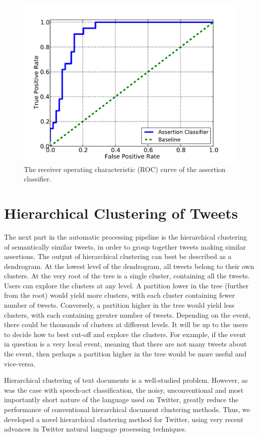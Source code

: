 \documentclass[letterpaper]{article}
\begin{document}
\begin{figure}[htbp]
\centering
\includegraphics[width=.70\columnwidth]{assertion_roc_2.pdf}
\caption{The receiver operating characteristic (ROC) curve of the assertion classifier.}
\label{fig:assertion_roc}
\end{figure}

\section{Hierarchical Clustering of Tweets}
The next part in the automatic processing pipeline is the hierarchical clustering of semantically similar tweets, in order to group together tweets making similar assertions. The output of hierarchical clustering can best be described as a dendrogram.%
At the lowest level of the dendrogram, all tweets belong to their own clusters. At the very root of the tree is a single cluster, containing all the tweets. Users can explore the clusters at any level. A partition lower in the tree (further from the root) would yield more clusters, with each cluster containing fewer number of tweets. Conversely, a partition higher in the tree would yield less clusters, with each containing greater number of tweets. Depending on the event, there could be thousands of clusters at different levels. It will be up to the users to decide how to best cut-off and explore the clusters. For example, if the event in question is a very local event, meaning that there are not many tweets about the event, then perhaps a partition higher in the tree would be more useful and vice-versa.




Hierarchical clustering of text documents is a well-studied problem. However, as was the case with speech-act classification, the noisy, unconventional and most importantly short nature of the language used on Twitter, greatly reduce the performance of conventional hierarchical document clustering methods. Thus, we developed a novel hierarchical clustering method for Twitter, using very recent advances in Twitter natural language processing techniques.
\end{document}
